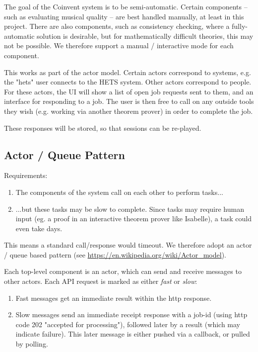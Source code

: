 \documentclass[10pt]{article}
\begin{document}
The goal of the Coinvent system is to be semi-automatic. 
Certain components -- such as evaluating musical quality -- are best handled manually, at least
in this project. There are also components, such as consistency checking, where a fully-automatic solution is desirable, but for mathematically difficult theories, this may not be possible.
We therefore support a manual / interactive mode for each component.

This works as part of the actor model. Certain actors correspond to systems, e.g. the "hets" user
connects to the HETS system. Other actors correspond to people. For these actors, the UI
will show a list of open job requests sent to them, and an interface for responding to a job.
The user is then free to call on any outside tools they wish (e.g. working via another theorem prover)
in order to complete the job.

These responses will be stored, so that sessions can be re-played.

\subsection{Actor / Queue Pattern}

Requirements:  
\begin{enumerate}
\item The components of the system call on each other to perform tasks...
\item ...but these tasks may be slow to complete. Since tasks may require human input (eg. a proof in an interactive theorem prover like Isabelle), a task could even take days.
\end{enumerate}
This means a standard call/response would timeout. We therefore adopt an actor / queue based pattern (see \url{https://en.wikipedia.org/wiki/Actor_model}). 

Each top-level component is an actor, which can send and receive messages to other actors. Each API request is marked as either {\em fast} or {\em slow}:
\begin{enumerate}
 \item Fast messages get an immediate result within the http response.
 \item Slow messages send an immediate receipt response with a job-id (using http code 202 "accepted for processing"), followed later by a result (which may indicate failure). This later message is either pushed via a callback, or pulled by polling.
\end{enumerate}
\end{document}
